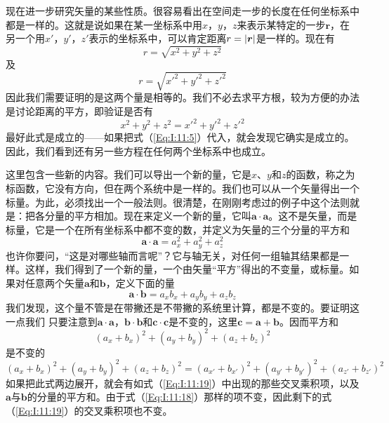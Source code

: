 现在进一步研究矢量的某些性质。很容易看出在空间走一步的长度在任何坐标系中都是一样的。这就是说如果在某一坐标系中用$x$，$y$，$z$来表示某特定的一步$\boldsymbol{r}$，在另一个用$x'$，$y'$，$z'$表示的坐标系中，可以肯定距离$r=\lvert\boldsymbol{r}\rvert$是一样的。现在有
\begin{equation*}
    r=\sqrt{x^2+y^2+z^2}
\end{equation*}
及
\begin{equation*}
    r=\sqrt{x'^2+y'^2+z'^2}
\end{equation*}
因此我们需要证明的是这两个量是相等的。我们不必去求平方根，较为方便的办法是讨论距离的平方，即验证是否有
\begin{equation}
    \label{Eq:I:11:17}
    x^2+y^2+z^2=x'^2+y'^2+z'^2
\end{equation}
最好此式是成立的——如果把式（\ref{Eq:I:11:5}）代入，就会发现它确实是成立的。因此，我们看到还有另一些方程在任何两个坐标系中也成立。

这里包含一些新的内容。我们可以导出一个新的量，它是$x$、$y$和$z$的函数，称之为标函数，它没有方向，但在两个系统中是一样的。我们也可以从一个矢量得出一个标量。为此，必须找出一个一般法则。很清楚，在刚刚考虑过的例子中这个法则就是：把各分量的平方相加。现在来定义一个新的量，它叫$\boldsymbol{a} \cdot \boldsymbol{a}$。这不是矢量，而是标量，它是一个在所有坐标系中都不变的数，并定义为矢量的三个分量的平方和
\begin{equation}
    \label{Eq:I:11:18}
    \boldsymbol{a} \cdot \boldsymbol{a}=a_x^2+a_y^2+a_z^2
\end{equation}
也许你要问，“这是对哪些轴而言呢”？它与轴无关，对任何一组轴其结果都是一样。这样，我们得到了一个新的量，一个由矢量“平方”得出的不变量，或标量。如果对任意两个矢量$\boldsymbol{a}$和$\boldsymbol{b}$，定义下面的量
\begin{equation}
    \label{Eq:I:11:19}
    \boldsymbol{a} \cdot \boldsymbol{b}=a_xb_x+a_yb_y+a_zb_z
\end{equation}
我们发现，这个量不管是在带撇还是不带撇的系统里计算，都是不变的。要证明这一点我们
只要注意到$\boldsymbol{a} \cdot \boldsymbol{a}$，$\boldsymbol{b} \cdot \boldsymbol{b}$和$\boldsymbol{c} \cdot \boldsymbol{c}$是不变的，这里$\boldsymbol{c}=\boldsymbol{a}+\boldsymbol{b}$。因而平方和
\begin{equation*}
    (a_x+b_x)^2+(a_y+b_y)^2+(a_z+b_z)^2
\end{equation*}
是不变的
\begin{equation}
    \label{Eq:I:11:20}
    (a_x+b_x)^2+(a_y+b_y)^2+(a_z+b_z)^2=(a_{x'}+b_{x'})^2+(a_{y'}+b_{y'})^2+(a_{z'}+b_{z'})^2
\end{equation}
如果把此式两边展开，就会有如式（\ref{Eq:I:11:19}）中出现的那些交叉乘积项，以及$\boldsymbol{a}$与$\boldsymbol{b}$的分量的平方和。由于式（\ref{Eq:I:11:18}）那样的项不变，因此剩下的式（\ref{Eq:I:11:19}）的交叉乘积项也不变。

